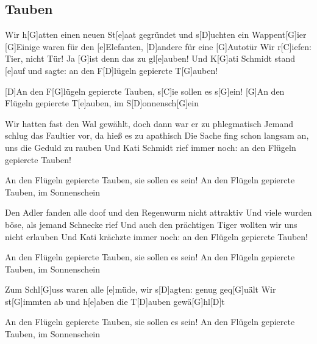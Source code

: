 \subsection*{Tauben   }
\begin{guitar}
Wir h[G]atten einen neuen St[e]aat gegründet und s[D]uchten ein Wappent[G]ier
[G]Einige waren für den [e]Elefanten, [D]andere für eine [G]Autotür
Wir r[C]iefen: Tier, nicht Tür! Ja [G]ist denn das zu gl[e]auben!
Und K[G]ati Schmidt stand [e]auf und sagte: an den F[D]lügeln gepiercte T[G]auben!



[D]An den F[G]lügeln gepiercte Tauben, s[C]ie sollen es s[G]ein!
[G]An den Flügeln gepiercte T[e]auben, im S[D]onnensch[G]ein



Wir hatten fast den Wal gewählt, doch dann war er zu phlegmatisch
Jemand schlug das Faultier vor, da hieß es zu apathisch
Die Sache fing schon langsam an, uns die Geduld zu rauben
Und Kati Schmidt rief immer noch: an den Flügeln gepiercte Tauben!



An den Flügeln gepiercte Tauben, sie sollen es sein!
An den Flügeln gepiercte Tauben, im Sonnenschein



Den Adler fanden alle doof und den Regenwurm nicht attraktiv
Und viele wurden böse, als jemand Schnecke rief
Und auch den prächtigen Tiger wollten wir uns nicht erlauben
Und Kati krächzte immer noch: an den Flügeln gepiercte Tauben!



An den Flügeln gepiercte Tauben, sie sollen es sein!
An den Flügeln gepiercte Tauben, im Sonnenschein



Zum Schl[G]uss waren alle [e]müde, wir s[D]agten: genug geq[G]uält
Wir st[G]immten ab und h[e]aben die T[D]auben gewä[G]hl[D]t



An den Flügeln gepiercte Tauben, sie sollen es sein!
An den Flügeln gepiercte Tauben, im Sonnenschein

\end{guitar}
